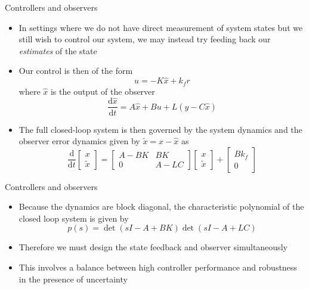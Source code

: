 \documentclass[10pt]{beamer-control}
\begin{document}
\begin{frame}{Controllers and observers}
  \begin{itemize}
    \item In settings where we do not have direct measurement of system states but we still wish to control our system, we may instead try feeding back our \textit{estimates} of the state
    \item Our control is then of the form
      \begin{equation}
        u=-K\hat{x}+k_f r
      \end{equation}
      where $\hat{x}$ is the output of the observer
      \begin{equation}
        \frac{\mathrm{d}\hat{x}}{\mathrm{d}t} = A\hat{x}+Bu+L(y-C\hat{x})
      \end{equation}
    \item The full closed-loop system is then governed by the system dynamics and the observer error dynamics given by $\tilde{x}=x-\hat{x}$ as
      \begin{equation}
        \frac{\mathrm{d}}{\mathrm{d}t} \begin{bmatrix}
          x \\ \tilde{x}
        \end{bmatrix} = \begin{bmatrix}
          A-BK & BK\\
          0 & A-LC
        \end{bmatrix} \begin{bmatrix}
          x \\ \tilde{x}
        \end{bmatrix}  + \begin{bmatrix}
          Bk_f \\ 0
        \end{bmatrix}
      \end{equation}
  \end{itemize}

\end{frame}

\begin{frame}{Controllers and observers}
  \begin{itemize}
    \item Because the dynamics are block diagonal, the characteristic polynomial of the closed loop system is given by
      \begin{equation}
        p(s) = \operatorname{det}(sI-A+BK)\operatorname{det}(sI-A+LC)
      \end{equation}
    \item Therefore we must design the state feedback and observer simultaneously
    \item This involves a balance between high controller performance and robustness in the presence of uncertainty
  \end{itemize}
\end{frame}


\SUMMARYFRAME
\FINALE
\end{document}
